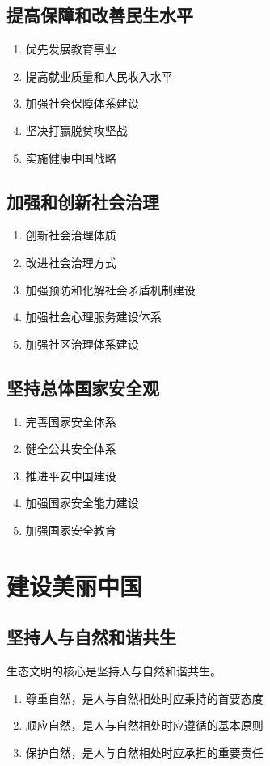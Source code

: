     \subsection{提高保障和改善民生水平}
        \begin{enumerate}
            \item 优先发展教育事业
            \item 提高就业质量和人民收入水平
            \item 加强社会保障体系建设
            \item 坚决打赢脱贫攻坚战
            \item 实施健康中国战略
        \end{enumerate}

    \subsection{加强和创新社会治理}
        \begin{enumerate}
            \item 创新社会治理体质
            \item 改进社会治理方式
            \item 加强预防和化解社会矛盾机制建设
            \item 加强社会心理服务建设体系
            \item 加强社区治理体系建设
        \end{enumerate}

    \subsection{坚持总体国家安全观}
        \begin{enumerate}
            \item 完善国家安全体系
            \item 健全公共安全体系
            \item 推进平安中国建设
            \item 加强国家安全能力建设
            \item 加强国家安全教育
        \end{enumerate}


\section{建设美丽中国}
    \subsection{坚持人与自然和谐共生}
        生态文明的核心是坚持人与自然和谐共生。
        \begin{enumerate}
            \item 尊重自然，是人与自然相处时应秉持的首要态度
            \item 顺应自然，是人与自然相处时应遵循的基本原则
            \item 保护自然，是人与自然相处时应承担的重要责任
        \end{enumerate}

